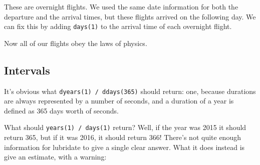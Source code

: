 \documentclass[]{book}
\newenvironment{Shaded}{\begin{snugshade}}{\end{snugshade}}
\newcommand{\KeywordTok}[1]{\textcolor[rgb]{0.13,0.29,0.53}{\textbf{{#1}}}}
\newcommand{\DataTypeTok}[1]{\textcolor[rgb]{0.13,0.29,0.53}{{#1}}}
\newcommand{\DecValTok}[1]{\textcolor[rgb]{0.00,0.00,0.81}{{#1}}}
\newcommand{\StringTok}[1]{\textcolor[rgb]{0.31,0.60,0.02}{{#1}}}
\newcommand{\CommentTok}[1]{\textcolor[rgb]{0.56,0.35,0.01}{\textit{{#1}}}}
\newcommand{\NormalTok}[1]{{#1}}
\begin{document}
These are overnight flights. We used the same date information for both
the departure and the arrival times, but these flights arrived on the
following day. We can fix this by adding \texttt{days(1)} to the arrival
time of each overnight flight.

\begin{Shaded}
\end{Shaded}

Now all of our flights obey the laws of physics.

\begin{Shaded}
\end{Shaded}

\subsection{Intervals}\label{intervals}

It's obvious what \texttt{dyears(1)\ /\ ddays(365)} should return: one,
because durations are always represented by a number of seconds, and a
duration of a year is defined as 365 days worth of seconds.

What should \texttt{years(1)\ /\ days(1)} return? Well, if the year was
2015 it should return 365, but if it was 2016, it should return 366!
There's not quite enough information for lubridate to give a single
clear answer. What it does instead is give an estimate, with a warning:
\end{document}
